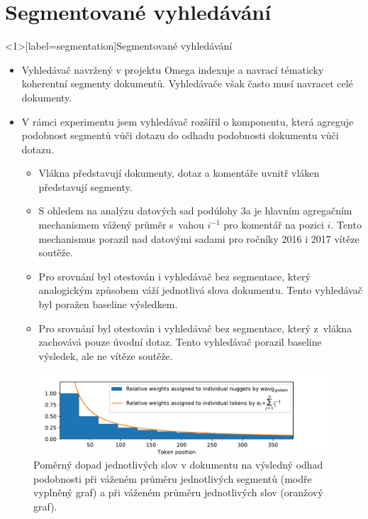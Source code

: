 \documentclass[aspectratio=169,t]{beamer}
\begin{document}

\section{Segmentované vyhledávání}
\begin{frame}<1>[label=segmentation]{Segmentované vyhledávání}
\begin{itemize}
  \item<1-> Vyhledávač navržený v projektu Omega indexuje a navrací
    \alert<1>{tématicky koherentní segmenty dokumentů}. Vyhledávače však často
    musí navracet celé dokumenty.
  \item<2-> V rámci experimentu jsem vyhledávač rozšířil o komponentu, která
    \alert<2>{agreguje podobnost segmentů vůči dotazu} do odhadu podobnosti
      dokumentu vůči dotazu.
    \begin{itemize}
      \item<3-> \alert<3>{Vlákna představují dokumenty}, \alert<3>{dotaz a
        komentáře uvnitř vláken představují segmenty}.
      \item<3-> S ohledem na analýzu datových sad podúlohy 3a je hlavním agregačním
        mechanismem \alert<3-4>{vážený průměr s~vahou $i^{-1}$ pro komentář na
        pozici $i$}. Tento mechanismus porazil nad datovými sadami pro ročníky
        2016 i 2017 vítěze soutěže.
      \item<4-> Pro srovnání byl otestován i \alert<4>{vyhledávač bez segmentace},
        který analogickým způsobem \alert<4>{váží jednotlivá slova dokumentu}.
        Tento vyhledávač byl poražen baseline výsledkem.
      \item<5-> Pro srovnání byl otestován i \alert<5>{vyhledávač bez segmentace},
        který \alert<5>{z~vlákna zachovává pouze úvodní dotaz}. Tento
        vyhledávač porazil baseline výsledek, ale ne vítěze soutěže.
    \end{itemize}
\end{itemize}
\end{frame}


\begin{frame}[c]
\begin{figure}
\vfill
\begin{center}
\includegraphics[trim={0.8cm 0.0cm 2.8cm 0.5cm}, scale=0.8]{figs/quality-evaluation-4.pdf}
\caption{Poměrný dopad jednotlivých slov v dokumentu na výsledný odhad
  podobnosti při váženém průměru jednotlivých segmentů (modře vyplněný graf) a
  při váženém průměru jednotlivých slov (oranžový graf).}
\end{center}
\end{figure}
\end{frame}
\end{document}
